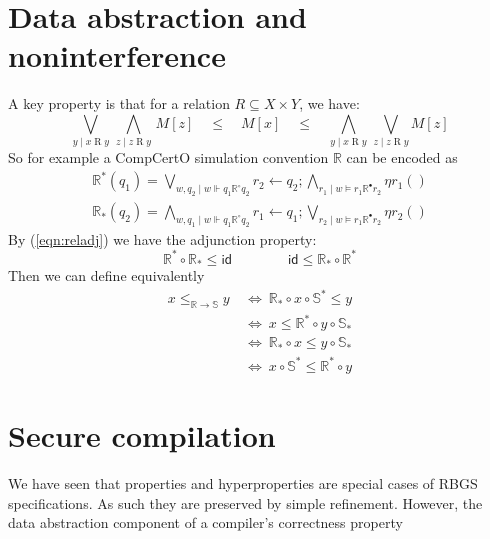 \documentclass[11pt]{article}
\begin{document}


\section{Data abstraction and noninterference} %

A key property is that for a relation $R \subseteq X \times Y$, we have:
\begin{equation} \label{eqn:reladj}
  \bigvee_{y \mid x \mathrel{R} y} \,
  \bigwedge_{z \mid z \mathrel{R} y} \, M[z]
  \quad \le \quad M[x] \quad \le \quad
  \bigwedge_{y \mid x \mathrel{R} y} \,
    \bigvee_{z \mid z \mathrel{R} y} M[z]
\end{equation}
So for example a CompCertO simulation convention $\mathbb{R}$
can be encoded as
\begin{gather*}
  \mathbb{R}^*(q_1) =
    \bigvee_{w, q_2 \mid w \Vdash q_1 \mathbb{R}^\circ q_2}
      r_2 \leftarrow q_2 \mathbin;
          \bigwedge_{r_1 \mid w \vDash r_1 \mathbb{R}^\bullet r_2} \eta r_1 ()
\\[1ex]
  \mathbb{R}_*(q_2) =
    \bigwedge_{w, q_1 \mid w \Vdash q_1 \mathbb{R}^\circ q_2}
      r_1 \leftarrow q_1 \mathbin;
          \bigvee_{r_2 \mid w \vDash r_1 \mathbb{R}^\bullet r_2} \eta r_2 ()
\end{gather*}
By (\ref{eqn:reladj}) we have the adjunction property:
\[
  \mathbb{R}^* \circ \mathbb{R}_* \le \mathsf{id}
  \qquad \qquad
  \mathsf{id} \le \mathbb{R}_* \circ \mathbb{R}^*
\]
Then we can define equivalently
\begin{align*}
  x \le_{\mathbb{R} \rightarrow \mathbb{S}} y &\:\Leftrightarrow\:
  \mathbb{R}_* \circ x \circ \mathbb{S}^* \le y \\ &\:\Leftrightarrow\:
  x \le \mathbb{R}^* \circ y \circ \mathbb{S}_* \\ &\:\Leftrightarrow\:
  \mathbb{R}_* \circ x \le y \circ \mathbb{S}_* \\ &\:\Leftrightarrow\:
  x \circ \mathbb{S}^* \le \mathbb{R}^* \circ y
\end{align*}


\section{Secure compilation} %

We have seen that properties and hyperproperties
are special cases of RBGS specifications.
As such they are preserved by simple refinement.
However,
the data abstraction component of a compiler's correctness property
\end{document}
